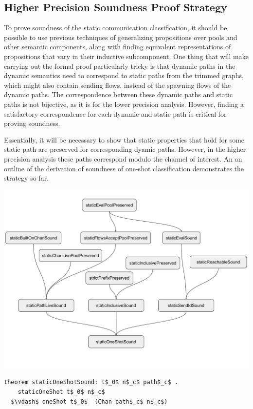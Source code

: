 \documentclass[letterpaper, 11pt]{extarticle}
\begin{document}
\subsection{Higher Precision Soundness Proof Strategy}
To prove soundness of the static communication classification, it should be possible to use
previous techniques of generalizing propositions over pools and other semantic components,
along with finding equivalent representations of propositions that vary in their inductive
subcomponent. One thing that will make carrying out the formal proof particularly tricky is
that dynamic paths in the dynamic semantics need to correspond to static paths from
the trimmed graphs, which might also contain sending flows,
instead of the spawning flows of the dynamic paths.
The correspondence between these dynamic paths and static paths
is not bijective, as it is for the lower precision analysis. However, finding a satisfactory
correspondence for each dynamic and static path is critical for proving soundness.

Essentially, it will be necessary to show that static
properties that hold for some static path are preserved for corresponding dyamic paths. 
However, in the higher precision analysis these paths correspond modulo the channel of interest.
An an outline of the derivation of soundness of one-shot classification demonstrates the strategy so far.

\includegraphics[width=1\textwidth]{cml-proof-high.pdf}

\begin{lstlisting}[language=logic, mathescape]
  theorem staticOneShotSound: t$_0$ n$_c$ path$_c$ . 
    staticOneShot t$_0$ n$_c$
  $\vdash$ oneShot t$_0$  (Chan path$_c$ n$_c$)
\end{lstlisting}
\end{document}
